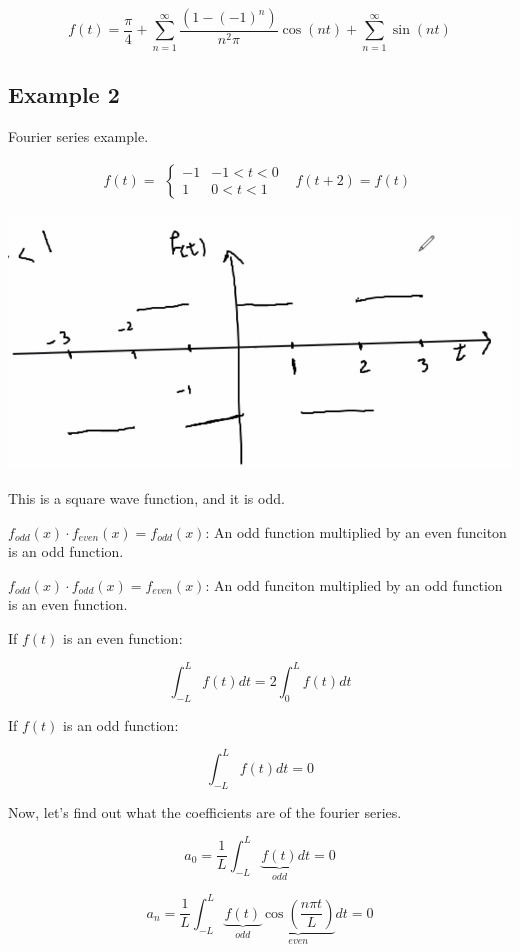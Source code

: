 \documentclass{article}
\begin{document}
$$f(t) = \frac{\pi}{4} + \sum_{n = 1}^\infty \frac{(1-  (-1)^n)}{n^2 \pi} \cos(n t) + \sum_{n = 1}^\infty \sin(n t)$$

\subsection{Example 2}

Fourier series example. 

$$f(t) = \begin{matrix} \left\{ \begin{matrix} -1 & -1 < t < 0 \\ 1 & 0 < t < 1 \end{matrix} \right. & f(t+2) = f(t) \end{matrix}$$

\includegraphics[width = 0.95 \textwidth]{image1.png}

This is a square wave function, and it is odd. 

$f_{odd}(x) \cdot f_{even} (x) = f_{odd} (x)$: An odd function multiplied by an even funciton is an odd function. 

$f_{odd} (x) \cdot f_{odd} (x) = f_{even} (x)$: An odd funciton multiplied by an odd function is an even function. 


If $f(t)$ is an even function:

$$\int_{-L}^L f(t) dt = 2 \int_0^L f(t) dt$$

If $f(t)$ is an odd function:

$$\int_{-L}^L f(t) dt = 0$$

Now, let's find out what the coefficients are of the fourier series. 

$$a_0 = \frac{1}{L} \int_{-L}^L \underbrace{f(t)}_{odd} dt = 0$$

$$a_n = \frac{1}{L} \int_{-L}^L \underbrace{f(t)}_{odd} \underbrace{\cos(\frac{n \pi t}{L})}_{even} dt = 0$$
\end{document}
